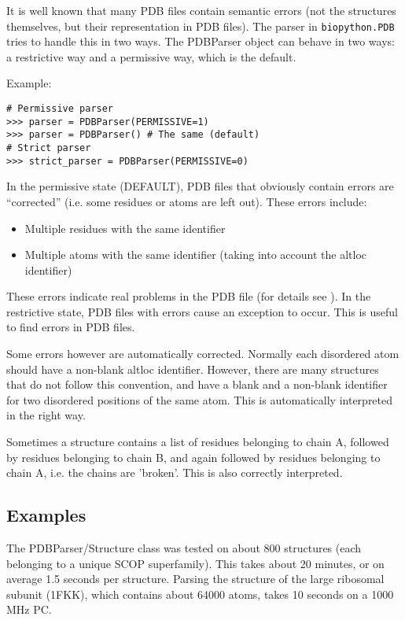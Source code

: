 It is well known that many PDB files contain semantic errors (not the
structures themselves, but their representation in PDB files).
The parser in \verb+biopython.PDB+ tries to handle this in two ways. The PDBParser
object can behave in two ways: a restrictive way and a permissive
way, which is the default.

Example:

\begin{verbatim}
# Permissive parser
>>> parser = PDBParser(PERMISSIVE=1)
>>> parser = PDBParser() # The same (default)
# Strict parser
>>> strict_parser = PDBParser(PERMISSIVE=0)
\end{verbatim}
In the permissive state (DEFAULT), PDB files that obviously contain
errors are ``corrected'' (i.e. some residues or atoms are left out).
These errors include:

\begin{itemize}
\item Multiple residues with the same identifier
\item Multiple atoms with the same identifier (taking into account the altloc
identifier)
\end{itemize}
These errors indicate real problems in the PDB file (for details see
\cite[Hamelryck and Manderick, 2003]{hamelryck2003a}). In the restrictive state, PDB files with errors cause an exception to occur. This is useful to find errors in PDB files.

Some errors however are automatically corrected. Normally each disordered
atom should have a non-blank altloc identifier. However, there are
many structures that do not follow this convention, and have a blank
and a non-blank identifier for two disordered positions of the same
atom. This is automatically interpreted in the right way.

Sometimes a structure contains a list of residues belonging to chain
A, followed by residues belonging to chain B, and again followed by
residues belonging to chain A, i.e. the chains are 'broken'. This
is also correctly interpreted.

\subsection{Examples}
\label{sec:problem_structures}

The PDBParser/Structure class was tested on about 800 structures (each belonging
to a unique SCOP superfamily). This takes about 20 minutes, or on average 1.5
seconds per structure. Parsing the structure of the large ribosomal subunit
(1FKK), which contains about 64000 atoms, takes 10 seconds on a 1000 MHz PC.

